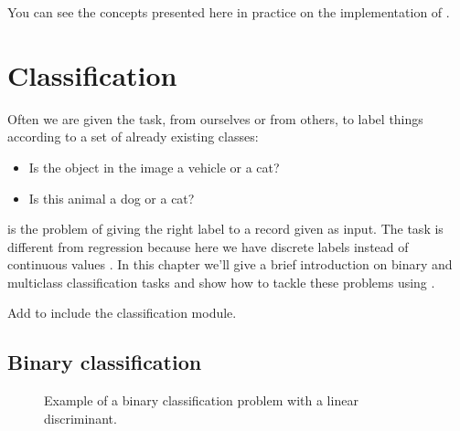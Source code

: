 \documentclass[letterpaper,10pt,english]{sphinxmanual}
\let\sphinxpxdimen\pdfpxdimen\else\newdimen\sphinxpxdimen
\begin{document}
\sphinxAtStartPar
You can see the concepts presented here in practice on the implementation of .


\chapter{Classification}
\label{\detokenize{getting_started/classification:classification}}\label{\detokenize{getting_started/classification::doc}}
\sphinxAtStartPar
Often we are given the task, from ourselves or from others, to label things according to a set of already existing classes:
\begin{itemize}
\item {} 
\sphinxAtStartPar
Is the object in the image a vehicle or a cat?

\item {} 
\sphinxAtStartPar
Is this animal a dog or a cat?

\end{itemize}

\sphinxAtStartPar
{} is the problem of giving the right label to a record given as input. The task is different from regression because
here we have discrete labels instead of continuous values . In this chapter we’ll give a brief introduction on binary
and multi\sphinxhyphen{}class classification tasks and show how to tackle these problems using .

\sphinxAtStartPar
Add  to include the classification module.


\section{Binary classification}
\label{\detokenize{getting_started/classification:binary-classification}}
\begin{figure}[htbp]
\centering
\capstart

\noindent\sphinxincludegraphics[width=400\sphinxpxdimen]{{binclass}.png}
\caption{Example of a binary classification problem with a linear discriminant.}\label{\detokenize{getting_started/classification:id14}}\end{figure}
\end{document}
